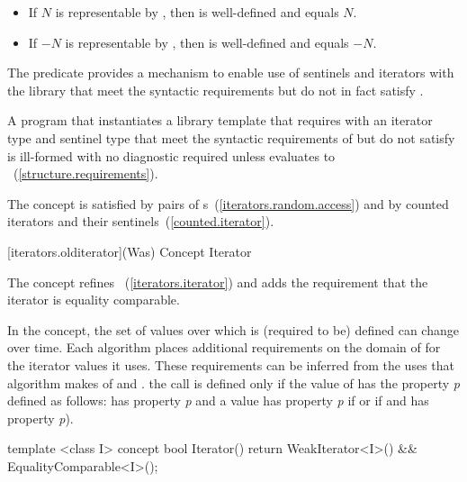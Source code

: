 \begin{addedblock}
{\begin{itemdescr}
\begin{itemize}
\item If $N$ is representable by ,
      then  is well-defined and equals $N$.

\item If $-N$ is representable by ,
      then  is well-defined and equals $-N$.
\end{itemize}
\end{itemdescr}

\pnum
The  predicate provides a mechanism to
enable use of sentinels and iterators with the library that meet the
syntactic requirements but do not in fact satisfy .

\pnum
\enternote A program that instantiates a library template that requires
 with an iterator type  and sentinel type
 that meet the syntactic requirements of 
but do not satisfy  is ill-formed with no diagnostic required
unless  evaluates to
~(\ref{structure.requirements}). \exitnote
} %

\enternote The 
concept is satisfied by pairs of
s~(\ref{iterators.random.access}) and by
counted iterators and their sentinels~(\ref{counted.iterator}).\exitnote


{\color{oldclr}
[iterators.olditerator]{(Was) Concept Iterator}

\pnum
The  concept refines ~(\ref{iterators.iterator}) and adds
the requirement that the iterator is equality comparable.

\pnum
In the  concept, the set of values over which
\tcode{==} is (required to be) defined can change over time.
Each algorithm places additional requirements on the domain of
\tcode{==} for the iterator values it uses.
These requirements can be inferred from the uses that algorithm
makes of \tcode{==} and \tcode{!=}.
\enterexample
the call 
is defined only if the value of 
has the property \textit{p}
defined as follows:
 has property \textit{p}
and a value 
has property \textit{p}
if
or if
and
has property
\textit{p}).
\exitexample

\begin{itemdecl}
  template <class I>
  concept bool Iterator() {
    return WeakIterator<I>() &&
      EqualityComparable<I>();
  }
\end{itemdecl}
} %
\end{addedblock}

